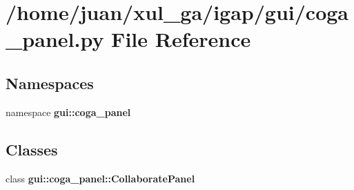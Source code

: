 \section{/home/juan/xul\_\-ga/igap/gui/coga\_\-panel.py File Reference}
\label{coga__panel_8py}
\subsection*{Namespaces}
\begin{CompactItemize}
\item 
namespace {\bf gui::coga\_\-panel}
\end{CompactItemize}
\subsection*{Classes}
\begin{CompactItemize}
\item 
class {\bf gui::coga\_\-panel::CollaboratePanel}
\end{CompactItemize}
